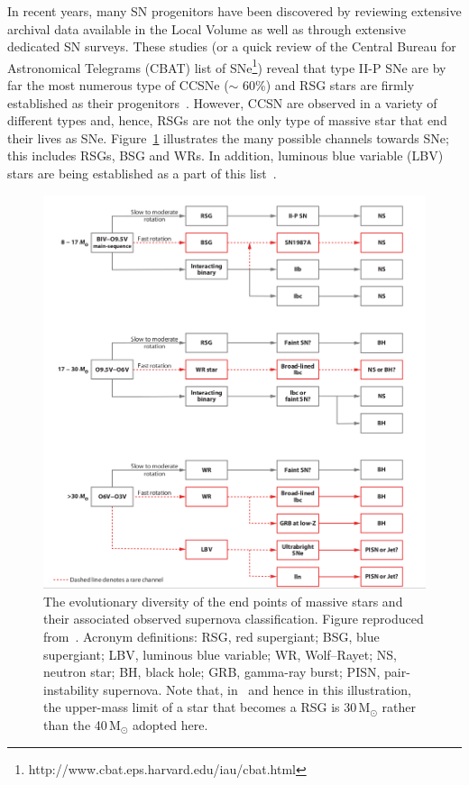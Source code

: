 In recent years, many SN progenitors have been discovered by reviewing extensive archival data available in the Local Volume as well as through extensive dedicated SN surveys.
These studies (or a quick review of the Central Bureau for Astronomical Telegrams (CBAT) list of SNe\footnote{http://www.cbat.eps.harvard.edu/iau/cbat.html}) reveal that type II-P SNe are by far the most numerous type of CCSNe ($\sim$ 60\%) and RSG stars are firmly established as their progenitors~\citep[][and references therein]{Smartt09}.
However, CCSN are observed in a variety of different types and, hence, RSGs are not the only type of massive star that end their lives as SNe.
Figure~\ref{fig:SNe-Smartt} illustrates the many possible channels towards SNe; this includes RSGs, BSG and WRs.
In addition, luminous blue variable (LBV) stars are being established as a part of this list~\citep[e.g.][]{Smartt09, Groh13}.

 \begin{figure}
 \centering
 \includegraphics[width=\textwidth]{intro/Smartt09fig12}
 \caption[Endpoints of massive stars]{The evolutionary diversity of the end points of massive stars and their associated observed supernova classification. Figure reproduced from~\cite{Smartt09}. Acronym definitions: RSG, red supergiant; BSG, blue supergiant; LBV, luminous blue variable; WR, Wolf--Rayet; NS, neutron star; BH, black hole; GRB, gamma-ray burst; PISN, pair-instability supernova.
 Note that, in~\citet{Smartt09} and hence in this illustration, the upper-mass limit of a star that becomes a RSG is 30\,M$_{\odot}$ rather than the 40\,M$_{\odot}$ adopted here.
 \label{fig:SNe-Smartt}}
\end{figure}

